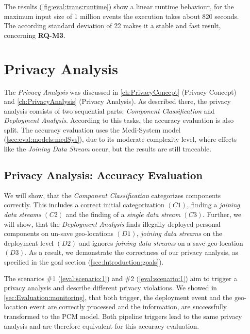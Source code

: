 The results (\autoref{fig:eval:trans:runtime}) show a linear runtime behaviour, for the maximum input size of 1 million events the execution takes about 820 seconds. The according standard deviation of 22 makes it a stable and fast result, concerning \textbf{RQ-M3}.

\section{Privacy Analysis}
\label{sec:Evaluation:privacyanalysis}

The \textit{Privacy Analysis} was discussed in \autoref{ch:PrivacyConcept} (Privacy Concept) and \autoref{ch:PrivacyAnalysis} (Privacy Analysis). As described there, the privacy analysis consists of two sequential parts: \textit{Component Classification} and \textit{Deployment Analysis}. According to this tasks, the accuracy evaluation is also split. The accuracy evaluation uses the Medi-System model (\autoref{sec:eval:models:medSys}), due to its moderate complexity level, where effects like the \textit{Joining Data Stream} occur, but the results are still traceable.

\subsection{Privacy Analysis: Accuracy Evaluation}

We will show, that the \textit{Component Classification} categorizes components correctly. This includes a correct initial categorization $(C1)$, finding a \textit{joining data streams} $(C2)$ and the finding of a \textit{single data stream} $(C3)$. Further, we will show, that the \textit{Deployment Analysis} finds illegally deployed personal components on un-save geo-locations $(D1)$, \textit{joining data streams} on the deployment level $(D2)$ and ignores \textit{joining data streams} on a save geo-location $(D3)$. As a result, we demonstrate the correctness of our privacy analysis, as specified in the goal section (\autoref{sec:Introduction:goals}).

The scenarios \#1 (\autoref{eval:scenario:1}) and \#2 (\autoref{eval:scenario:1}) aim to trigger a privacy analysis and describe different privacy violations. We showed in \autoref{sec:Evaluation:monitoring}, that both trigger, the deployment event and the geo-location event are correctly processed and the information, are successfully transformed to the PCM model. Both pipeline triggers lead to the same privacy analysis and are therefore equivalent for this accuracy evaluation. 

